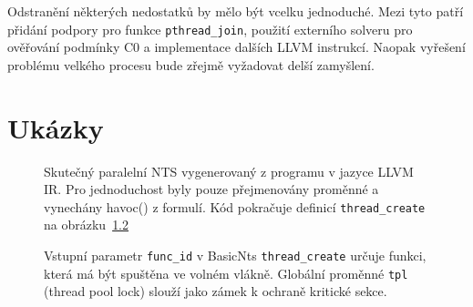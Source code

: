 \documentclass[12pt]{fithesis2}
\begin{document}
Odstranění některých nedostatků by mělo být vcelku jednoduché. Mezi tyto patří přidání podpory pro funkce \texttt{pthread\_join}, použití externího solveru pro ověřování podmínky C0 a implementace dalších LLVM instrukcí. Naopak vyřešení problému velkého procesu bude zřejmě vyžadovat delší zamyšlení.


\nocite{SymDivine}
\printbibliography

\appendix
\chapter{Ukázky}

\begin{figure}[h!]

\caption{Skutečný paralelní NTS vygenerovaný z programu v jazyce LLVM IR. Pro jednoduchost byly pouze přejmenovány proměnné a vynechány havoc() z formulí. Kód pokračuje definicí \texttt{thread\_create} na obrázku~\ref{fig:appendix:real-parallel-nts:2}} 
\label{fig:appendix:real-parallel-nts}
\end{figure}

\begin{figure}

\caption{Vstupní parametr \texttt{func\_id} v BasicNts \texttt{thread\_create} určuje funkci, která má být spuštěna ve volném vlákně. Globální proměnné \texttt{tpl} (thread pool lock) slouží jako zámek k ochraně kritické sekce.}
\label{fig:appendix:real-parallel-nts:2}
\end{figure}
\end{document}
